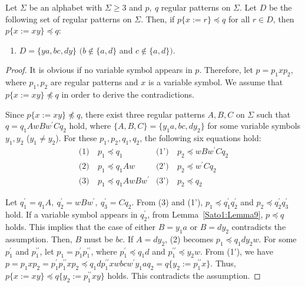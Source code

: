
\begin{lem}\label{追加部分}
  Let $\Sigma$ be an alphabet with $\Sigma \ge 3$ and $p,~q$ regular patterns on $\Sigma$.
  Let $D$ be the following set of regular patterns on $\Sigma$.
  Then, if $p \{ x := r \} \preceq q$ for all $r \in D$, then $p \{ x := xy \} \preceq q$:
  \begin{enumerate}
  \item[] $D = \{ ya, bc, dy \}$ $(b \not\in \{a,d\}$ and $c \not\in \{a,d\})$.
  \end{enumerate}
\end{lem}

  \begin{proof}
  It is obvious if no variable symbol appears in $p$.
  Therefore, let $p=p_{1}xp_{2}$, where $p_{1}, p_{2}$ are regular patterns and $x$ is a variable symbol.
  We assume that $p \{ x := xy \} \not \preceq q$ in order to derive the contradictions.

  Since $p \{ x := xy \} \not \preceq q$, there exist three regular patterns $A,B,C$ on $\Sigma$ such that $q=q_{1}AwBw^{\prime}Cq_{2}$ hold, where $\{ A,B,C \} = \{ y_{1}a,bc,dy_{2} \}$ for some variable symbols $y_{1}, y_{2}$ ($y_{1} \not= y_{2}$).
  For these $p_{1},p_{2},q_{1},q_{2}$, the following six equations hold:
  \begin{align*}
  \textrm{(1)}~& p_{1} \preceq q_{1} & \textrm{(1')}~& p_{2} \preceq wBw^{\prime}Cq_{2} \\
  \textrm{(2)}~& p_{1} \preceq q_{1}Aw & \textrm{(2')}~& p_{2} \preceq w^{\prime}Cq_{2} \\
  \textrm{(3)}~& p_{1} \preceq q_{1}AwBw^{\prime} & \textrm{(3')}~& p_{2} \preceq q_{2}
  \end{align*}
  
  Let $q^{\prime}_{1}=q_{1}A,~q^{\prime}_{2}=wBw^{\prime},~q^{\prime}_{3}=Cq_{2}$.
  From (3) and (1'), $p_{1} \preceq q^{\prime}_{1}q^{\prime}_{2}$ and $p_{2} \preceq q^{\prime}_{2}q^{\prime}_{3}$ hold.
  If a variable symbol appears in $q^{\prime}_{2}$, from Lemma~\ref{Sato1:Lemma9}, $p \preceq q$ holds.
  This implies that the case of either $B=y_{1}a$ or $B=dy_{2}$ contradicts the assumption.
  Then, $B$ must be $bc$.
  If $A=dy_{2}$,
  (2) becomes $p_{1} \preceq q_{1}dy_{2}w$.
  For some $p^{\prime}_{1}$ and $p^{\prime\prime}_{1}$, let $p_{1}=p^{\prime}_{1}p^{\prime\prime}_{1}$, where $p^{\prime}_{1} \preceq q_{1}d$ and $p^{\prime\prime}_{1} \preceq y_{2}w$. 
  From (1'), we have $p=p_{1}xp_{2}=p^{\prime}_{1}p^{\prime\prime}_{1}xp_{2} \preceq q_{1}dp^{\prime\prime}_{1}xwbcw^{\prime}y_{1}aq_{2}=q \{ y_{2}:=p^{\prime\prime}_{1}x \}$.
  Thus, $p \{ x := xy \} \preceq q \{ y_{2}:=p^{\prime\prime}_{1}xy \}$ holds. This contradicts the assumption.


\end{proof}
